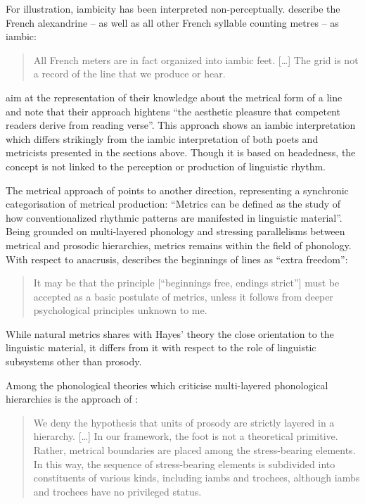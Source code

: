 \documentclass[output=paper
  ,nobabel
  ,uniformtopskip %
]{langscibook}
\begin{document}
For illustration, iambicity has been interpreted non-perceptually. \citet*[167;170]{FabbHalle2009} describe the French alexandrine – as well as all other French syllable counting metres – as iambic: 

\begin{quote}
All French meters are in fact organized into iambic feet. […] The grid is not a record of the line that we produce or hear.
\end{quote}

\noindent
\citet*[171]{FabbHalle2009} aim at the representation of their knowledge about the metrical form of a line and note that their approach hightens ``the aesthetic pleasure that competent readers derive from reading verse''. This approach shows an iambic interpretation which differs strikingly from the iambic interpretation of both poets and metricists presented in the sections above. Though it is based on headedness, the concept is not linked to the perception or production of linguistic rhythm. 

The metrical approach of \citet[221]{Hayes1989} points to another direction, representing a synchronic categorisation of metrical production: ``Metrics can be defined as the study of how conventionalized rhythmic patterns are manifested in linguistic material''. Being grounded on multi-layered phonology and stressing parallelisms between metrical and prosodic hierarchies, metrics remains within the field of phonology. With respect to anacrusis, \citet[256-257]{Hayes1989} describes the beginnings of lines as ``extra freedom'':

\begin{quote}
It may be that the principle [``beginnings free, endings strict''] must be accepted as a basic postulate of metrics, unless it follows from deeper psychological principles unknown to me.
\end{quote}

\noindent
While natural metrics shares with Hayes' theory the close orientation to the linguistic material, it
differs from it with respect to the role of linguistic subsystems other than prosody. 

Among the phonological theories which criticise multi-layered phonological hierarchies is the approach of \citet[439;440–441]{HalleIdsardi1995}:

\begin{quote}
We deny the hypothesis that units of prosody are strictly layered in a hierarchy. […] In our framework, the foot is not a theoretical primitive. Rather, metrical boundaries are placed among the stress-bearing elements. In this way, the sequence of stress-bearing elements is subdivided into constituents of various kinds, including iambs and trochees, although iambs and trochees have no privileged status. 
\end{quote}
\end{document}
